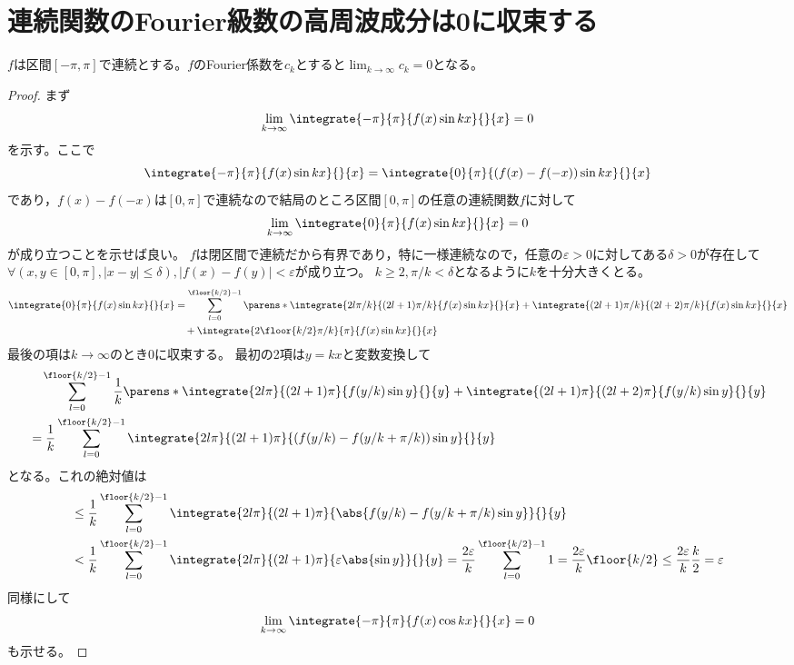     \section{連続関数のFourier級数の高周波成分は0に収束する}
        \label{連続関数のFourier 級数の高周波成分は0に収束する}
        \begin{shadebox}
            $f$は区間$[-\pi,\pi]$で連続とする。$f$のFourier係数を$c_k$とすると$\lim_{k\to\infty}c_k = 0$となる。
        \end{shadebox}
        \begin{proof}
            まず
            \[ \lim_{k\to\infty}\integrate{-\pi}{\pi}{f(x)\sin kx}{}{x} = 0 \]
            を示す。ここで
            \[ \integrate{-\pi}{\pi}{f(x)\sin kx}{}{x} = \integrate{0}{\pi}{(f(x)-f(-x))\sin kx}{}{x} \]
            であり，$f(x)-f(-x)$は$[0,\pi]$で連続なので結局のところ区間$[0,\pi]$の任意の連続関数$f$に対して
            \[ \lim_{k\to\infty}\integrate{0}{\pi}{f(x)\sin kx}{}{x} = 0 \]
            が成り立つことを示せば良い。
            $f$は閉区間で連続だから有界であり，特に一様連続なので，任意の$\varepsilon>0$に対してある$\delta>0$が存在して
            $\forall (x,y\in[0,\pi],|x-y|\leq\delta),|f(x)-f(y)|<\varepsilon$が成り立つ。
            $k \geq 2,\pi/k < \delta$となるように$k$を十分大きくとる。
            \begin{align*}
                \integrate{0}{\pi}{f(x)\sin kx}{}{x} &= \sum_{l=0}^{\floor{k/2}-1}\parens*{\integrate{2l\pi/k}{(2l+1)\pi/k}{f(x) \sin kx}{}{x} + \integrate{(2l+1)\pi/k}{(2l+2)\pi/k}{f(x) \sin kx}{}{x}} \\
                &\quad + \integrate{2\floor{k/2}\pi/k}{\pi}{f(x)\sin kx}{}{x}
            \end{align*}
            最後の項は$k\to\infty$のとき$0$に収束する。
            最初の2項は$y=kx$と変数変換して
            \begin{align*}
                &\quad \sum_{l=0}^{\floor{k/2}-1}\frac{1}{k}\parens*{\integrate{2l\pi}{(2l+1)\pi}{f(y/k) \sin y}{}{y} + \integrate{(2l+1)\pi}{(2l+2)\pi}{f(y/k) \sin y}{}{y}} \\
                &= \frac{1}{k} \sum_{l=0}^{\floor{k/2}-1} \integrate{2l\pi}{(2l+1)\pi}{(f(y/k) - f(y/k+\pi/k)) \sin y}{}{y}
            \end{align*}
            となる。これの絶対値は
            \begin{align*}
                &\leq \frac{1}{k} \sum_{l=0}^{\floor{k/2}-1} \integrate{2l\pi}{(2l+1)\pi}{\abs{f(y/k) - f(y/k+\pi/k) \sin y}}{}{y} \\
                &< \frac{1}{k} \sum_{l=0}^{\floor{k/2}-1} \integrate{2l\pi}{(2l+1)\pi}{\varepsilon\abs{\sin y}}{}{y} = \frac{2\varepsilon}{k} \sum_{l=0}^{\floor{k/2}-1}1 = \frac{2\varepsilon}{k}\floor{k/2} \leq \frac{2\varepsilon}{k}\frac{k}{2} = \varepsilon
            \end{align*}
            同様にして
            \[ \lim_{k\to\infty}\integrate{-\pi}{\pi}{f(x)\cos kx}{}{x} = 0 \]
            も示せる。
        \end{proof}
